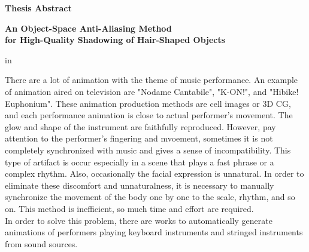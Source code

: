 \begin{center}
{\bf {\large Thesis Abstract}}

\vspace{2ex}

{\bf {\large An Object-Space Anti-Aliasing Method\\for High-Quality Shadowing of Hair-Shaped Objects}}
\end{center}

\vspace{3ex}

 in

There are a lot of animation with the theme of music performance.
%
An example of animation aired on television are "Nodame Cantabile", "K-ON!", and "Hibike! Euphonium".
%
These animation production methods are cell images or 3D CG, and each performance animation is close to actual performer's movement.
%
The glow and shape of the instrument are faithfully reproduced.
%
However, pay attention to the performer's fingering and mvoement, 
sometimes it is not completely synchronized with music and gives a sense of incompatibility.
%
This type of artifact is occur especially in a scene that plays a fast phrase or a complex rhythm.
%
Also, occasionally the facial expression is unnatural.
%
In order to eliminate these discomfort and unnaturalness, 
it is necessary to manually synchronize the movement of the body one by one to the scale, rhythm, and so on.
%
This method is inefficient, so much time and effort are required.\\
\indent
%
In order to solve this problem, there are works to automatically generate animations of performers playing keyboard instruments and stringed instruments from sound sources.
